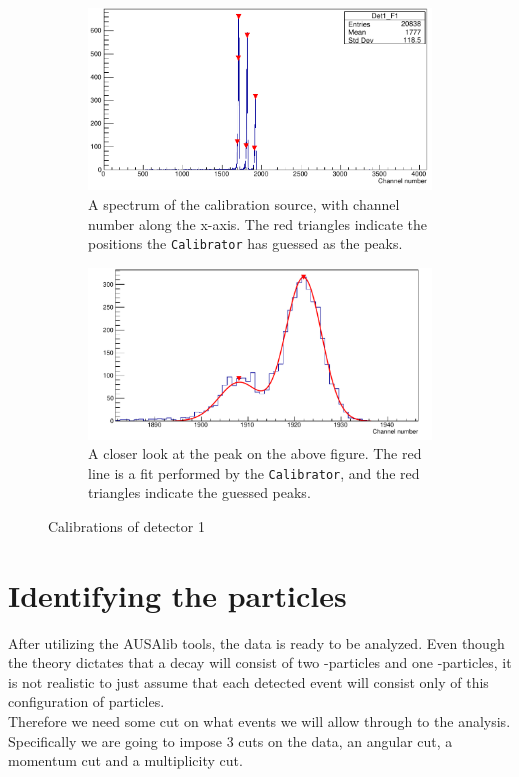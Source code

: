 \begin{figure}[H]
	\begin{subfigure}{\linewidth}
		\centering
		\includegraphics[width=.9\linewidth]{../figures/cali/det1f1-cropped.pdf}
		\caption{A spectrum of the calibration source, with channel number along the x-axis. The red triangles indicate the positions the \texttt{Calibrator} has guessed as the peaks.}
		\label{fig:singleStripExample}
	\end{subfigure}
	\begin{subfigure}{\textwidth}
		\centering
		\includegraphics[width=.9\linewidth]{../figures/cali/det1f1PeakMostLeft-cropped}
		\caption{A closer look at the  peak on the above figure. The red line is a fit performed by the \texttt{Calibrator}, and the red triangles indicate the guessed peaks. }
		\label{fig:peakExample}
	\end{subfigure}
	\caption{Calibrations of detector 1}
	\label{fig:CaliExamples}
\end{figure}


\section{Identifying the particles}
After utilizing the AUSAlib tools, the data is ready to be analyzed. Even though the theory dictates that a decay will consist of two \al-particles and one \be-particles, it is not realistic to just assume that each detected event will consist only of this configuration of particles. \\
Therefore we need some cut on what events we will allow through to the analysis. Specifically we are going to impose 3 cuts on the data, an angular cut, a momentum cut and a multiplicity cut.



